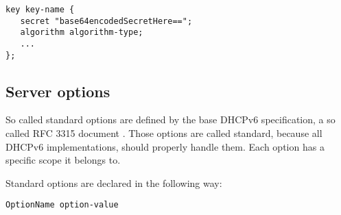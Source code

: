\begin{lstlisting}
key key-name {
   secret "base64encodedSecretHere==";
   algorithm algorithm-type;
   ...
};
\end{lstlisting}

\subsection{Server options}

So called standard options are defined by the base DHCPv6 specification,
a so called RFC 3315 document \cite{rfc3315}. Those options are
called standard, because all DHCPv6 implementations, should properly
handle them. Each option has a specific scope it belongs to.

Standard options are declared in the following way:

\begin{lstlisting}
OptionName option-value
\end{lstlisting}

